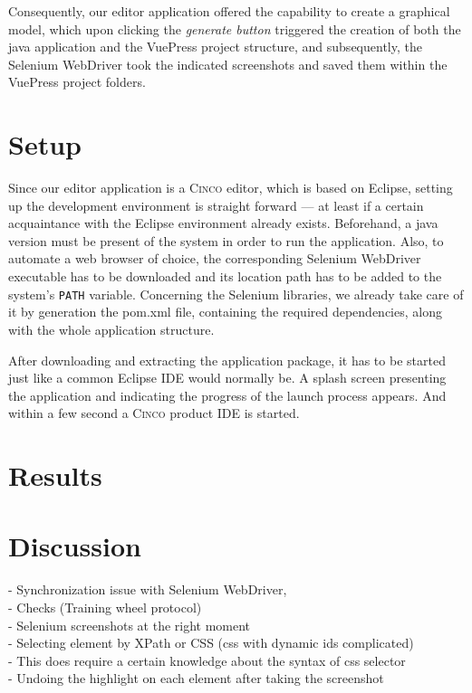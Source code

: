 Consequently, our editor application offered the capability to create a graphical model, which upon clicking the \textit{generate button} triggered the creation of both the java application and the VuePress project structure, and subsequently, the Selenium WebDriver took the indicated screenshots and saved them within the VuePress project folders.

\section{Setup}\label{sec:setup}

Since our editor application is a \textsc{Cinco} editor, which is based on Eclipse, setting up the development environment is straight forward --- at least if a certain acquaintance with the Eclipse environment already exists. Beforehand, a java version must be present of the system in order to run the application. Also, to automate a web browser of choice, the corresponding Selenium WebDriver executable has to be downloaded and its location path has to be added to the system's \lstinline{PATH} variable. Concerning the Selenium libraries, we already take care of it by generation the pom.xml file, containing the required dependencies, along with the whole application structure.

After downloading and extracting the application package, it has to be started just like a common Eclipse IDE would normally be. A splash screen presenting the application and indicating the progress of the launch process appears. And within a few second a \textsc{Cinco} product IDE is started. 

\section{Results}\label{sec:res}

\section{Discussion}\label{sec:disc}

- Synchronization issue with Selenium WebDriver,\\
- Checks (Training wheel protocol)\\
- Selenium screenshots at the right moment\\
- Selecting element by XPath or CSS (css with dynamic ids complicated)\\
    - This does require a certain knowledge about the syntax of css selector\\
- Undoing the highlight on each element after taking the screenshot\\
